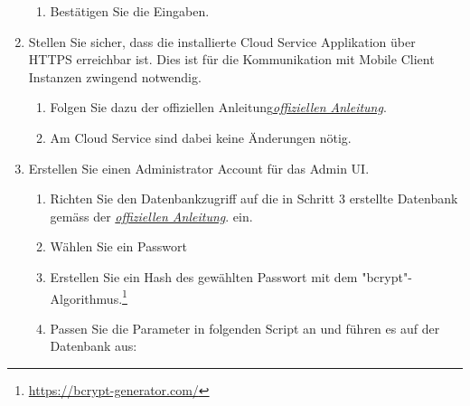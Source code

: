 \begin{enumerate}
\begin{enumerate}
        \item Bestätigen Sie die Eingaben.
    \end{enumerate}
    \item Stellen Sie sicher, dass die installierte Cloud Service Applikation über HTTPS erreichbar ist. Dies ist für die Kommunikation mit Mobile Client Instanzen zwingend notwendig.
    \begin{enumerate}
        \item Folgen Sie dazu der offiziellen Anleitung\href{https://aws.amazon.com/premiumsupport/knowledge-center/elastic-beanstalk-https-configuration/}{\textit{offiziellen Anleitung}}\cite{aws-elastic-https}.
        \item Am Cloud Service sind dabei keine Änderungen nötig. 
    \end{enumerate}
    \item Erstellen Sie einen Administrator Account für das Admin UI.
    \begin{enumerate}
        \item Richten Sie den Datenbankzugriff auf die in Schritt 3 erstellte Datenbank gemäss der \href{https://docs.aws.amazon.com/AmazonRDS/latest/UserGuide/USER_ConnectToPostgreSQLInstance.html}{\textit{offiziellen Anleitung}}\cite{aws-elastic-rds-access}. ein.
        \item Wählen Sie ein Passwort
        \item Erstellen Sie ein Hash des gewählten Passwort mit dem "bcrypt"-Algorithmus.\footnote{\url{https://bcrypt-generator.com/}}
        \item Passen Sie die Parameter in folgenden Script an und führen es auf der Datenbank aus:
        

    \end{enumerate}

\end{enumerate}


\clearpage
